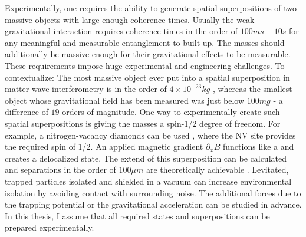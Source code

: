 Experimentally, one requires the ability to generate spatial superpositions of two massive objects with large enough coherence times. Usually the weak gravitational interaction requires coherence times in the order of $100\si{ms} - 10\si{s}$ for any meaningful and measurable entanglement to built up. The masses should additionally be massive enough for their gravitational effects to be measurable.
These requirements impose huge experimental and engineering challenges. To contextualize: The most massive object ever put into a spatial superposition in matter-wave interferometry is in the order of $4 \times 10^{-23}\si{kg}$ \cite{Fein_2019}, whereas the smallest object whose gravitational field has been measured was just below $100 \si{mg}$ \cite{Westphal_2021} - a difference of $19$ orders of magnitude.
One way to experimentally create such spatial superpositions is giving the masses a spin-1/2 degree of freedom. For example, a nitrogen-vacancy diamonds can be used \cite{Bose_2017}, where the NV site provides the required spin of 1/2. An applied magnetic gradient $\partial_x B$ functions like a  and creates a delocalized state.
The extend of this superposition can be calculated and separations in the order of $100 \si{\mu m}$ are theoretically achievable \cite{Bose_2017}.
Levitated, trapped particles isolated and shielded in a vacuum can increase environmental isolation by avoiding contact with surrounding noise. The additional forces due to the trapping potential or the gravitational acceleration can be studied in advance. 
In this thesis, I assume that all required states and superpositions can be prepared experimentally.

